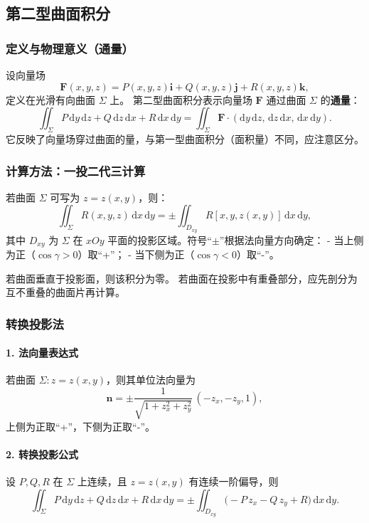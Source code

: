 \subsection{第二型曲面积分}

\subsubsection{定义与物理意义（通量）}

设向量场
\[
      \mathbf{F}(x, y, z) = P(x, y, z)\mathbf{i} + Q(x, y, z)\mathbf{j} + R(x, y, z)\mathbf{k},
\]
定义在光滑有向曲面 $\Sigma$ 上。
第二型曲面积分表示向量场 $\mathbf{F}$ 通过曲面 $\Sigma$ 的\textbf{通量}：
\[
      \iint_{\Sigma} P\,\mathrm{d}y\,\mathrm{d}z + Q\,\mathrm{d}z\,\mathrm{d}x + R\,\mathrm{d}x\,\mathrm{d}y
      = \iint_{\Sigma} \mathbf{F} \cdot (\mathrm{d}y\,\mathrm{d}z,\, \mathrm{d}z\,\mathrm{d}x,\, \mathrm{d}x\,\mathrm{d}y).
\]
它反映了向量场穿过曲面的量，与第一型曲面积分（面积量）不同，应注意区分。


\subsubsection{计算方法：一投二代三计算}

若曲面 $\Sigma$ 可写为 $z = z(x, y)$，则：
\[
      \iint_{\Sigma} R(x, y, z)\,\mathrm{d}x\,\mathrm{d}y
      = \pm \iint_{D_{xy}} R[x, y, z(x, y)]\,\mathrm{d}x\,\mathrm{d}y,
\]
其中 $D_{xy}$ 为 $\Sigma$ 在 $xOy$ 平面的投影区域。符号“$\pm$”根据法向量方向确定：
- 当上侧为正（$\cos\gamma > 0$）取“+”；
- 当下侧为正（$\cos\gamma < 0$）取“-”。

若曲面垂直于投影面，则该积分为零。
若曲面在投影中有重叠部分，应先剖分为互不重叠的曲面片再计算。

\subsubsection{转换投影法}

\paragraph{1. 法向量表达式}
若曲面 $\Sigma: z = z(x, y)$，则其单位法向量为
\[
      \mathbf{n} = \pm \frac{1}{\sqrt{1 + z_x^2 + z_y^2}} \, (-z_x, -z_y, 1),
\]
上侧为正取“+”，下侧为正取“-”。

\paragraph{2. 转换投影公式}
设 $P, Q, R$ 在 $\Sigma$ 上连续，且 $z = z(x, y)$ 有连续一阶偏导，则
\[
      \iint_{\Sigma} P\,\mathrm{d}y\,\mathrm{d}z + Q\,\mathrm{d}z\,\mathrm{d}x + R\,\mathrm{d}x\,\mathrm{d}y
      = \pm \iint_{D_{xy}} \big(-P\,z_x - Q\,z_y + R\big)\,\mathrm{d}x\,\mathrm{d}y.
\]


